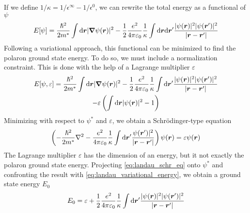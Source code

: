 If we define $1/\kappa = 1/\epsilon^\infty - 1/\epsilon^0$, we can rewrite the total energy as a functional of $\psi$
\begin{equation}
    E[\psi] = \frac{\hslash^2}{2m^*} \int \differential\vec{r} |\grad \psi(\vec{r})|^2 - \oh \frac{e^2}{4\pi\varepsilon_0} \frac{1}{\kappa} \int \differential \vec{r} \differential \vec{r}' \frac{|\psi(\vec{r})|^2|\psi(\vec{r}')|^2}{|\vec{r}-\vec{r}'|}
\end{equation}
Following a variational approach, this functional can be minimized to find the polaron ground state energy. To do so, we must include a normalization constraint. This is done with the help of a Lagrange multiplier $\varepsilon$
\begin{multline} \label{eq:landau_variational_energy}
    E[\psi, \varepsilon] = \frac{\hslash^2}{2m^*} \int \differential\vec{r} |\grad \psi(\vec{r})|^2 - \oh \frac{e^2}{4\pi\varepsilon_0} \frac{1}{\kappa} \int \differential \vec{r}' \frac{|\psi(\vec{r})|^2|\psi(\vec{r}')|^2}{|\vec{r}-\vec{r}'|}
    \\ - \varepsilon \left( \int \differential\vec{r} |\psi(\vec{r})|^2 -1 \right)
\end{multline}
Minimizing with respect to $\psi^*$ and $\varepsilon$, we obtain a Schr\"{o}dinger-type equation
\begin{equation} \label{eq:landau_schr_eq}
    \left(-\frac{\hslash^2}{2m^*} \laplacian - \frac{e^2}{4\pi\varepsilon_0} \frac{1}{\kappa} \int \differential \vec{r}' \frac{\psi(\vec{r}')|^2}{|\vec{r}-\vec{r}'|} \right) \psi(\vec{r}) = \varepsilon \psi(\vec{r})
\end{equation}
The Lagrange multiplier $\varepsilon$ has the dimension of an energy, but it not exactly the polaron ground state energy. Projecting \cref{eq:landau_schr_eq} onto $\psi^*$ and confronting the result with \cref{eq:landau_variational_energy}, we obtain a ground state energy $E_0$
\begin{equation}
    E_0 = \varepsilon + \oh \frac{e^2}{4\pi\varepsilon_0} \frac{1}{\kappa} \int \differential \vec{r}' \frac{|\psi(\vec{r})|^2|\psi(\vec{r}')|^2}{|\vec{r}-\vec{r}'|}
\end{equation}

